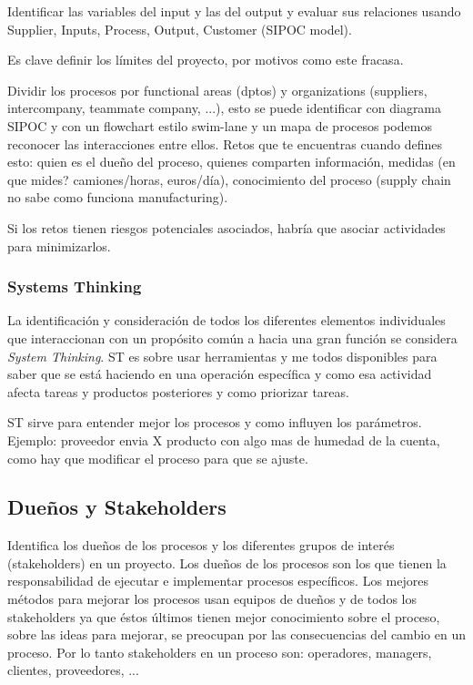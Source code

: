 \documentclass[]{article}
\begin{document}
Identificar las variables del input y las del output y evaluar sus relaciones usando Supplier, Inputs, Process, Output, Customer (SIPOC model).

Es clave definir los límites del proyecto, por motivos como este fracasa.

Dividir los procesos por functional areas (dptos) y organizations (suppliers, intercompany, teammate company, ...), esto se puede identificar con diagrama SIPOC y con un flowchart estilo swim-lane y un mapa de procesos podemos reconocer las interacciones entre ellos. Retos que te encuentras cuando defines esto: quien es el dueño del proceso, quienes comparten información, medidas (en que mides? camiones/horas, euros/día), conocimiento del proceso (supply chain no sabe como funciona manufacturing).

Si los retos tienen riesgos potenciales asociados, habría que asociar actividades para minimizarlos.

\subsubsection{Systems Thinking}

La identificación y consideración de todos los diferentes elementos individuales que interaccionan con un propósito común a hacia una gran función se considera \textit{System Thinking}. ST es sobre usar herramientas y me todos disponibles para saber que se está haciendo en una operación específica y como esa actividad afecta tareas y productos posteriores y como priorizar tareas.

ST sirve para entender mejor los procesos y como influyen los parámetros. Ejemplo: proveedor envia X producto con algo mas de humedad de la cuenta, como hay que modificar el proceso para que se ajuste. 

\subsection{Dueños y Stakeholders}

Identifica los dueños de los procesos y los diferentes grupos de interés (stakeholders) en un proyecto.
Los dueños de los procesos son los que tienen la responsabilidad de ejecutar e implementar procesos específicos. Los mejores métodos para mejorar los procesos usan equipos de dueños y de todos los stakeholders ya que éstos últimos tienen mejor conocimiento sobre el proceso, sobre las ideas para mejorar, se preocupan por las consecuencias del cambio en un proceso. Por lo tanto stakeholders en un proceso son: operadores, managers, clientes, proveedores, ...
\end{document}
